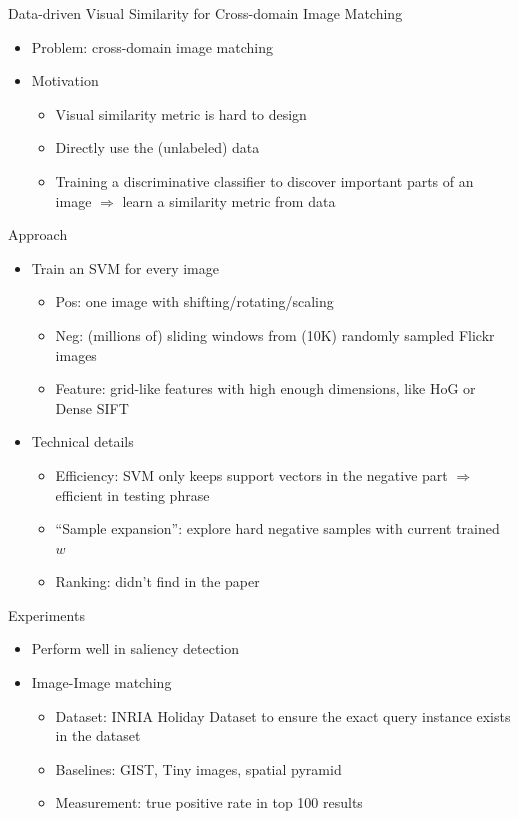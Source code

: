 \documentclass[12pt]{beamer}
\begin{document}
\begin{frame}{Data-driven Visual Similarity for Cross-domain Image Matching}
	\begin{itemize}
		\item Problem: cross-domain image matching
		\item Motivation
		\begin{itemize}
			\item Visual similarity metric is hard to design
			\item Directly use the (unlabeled) data
			\item Training a discriminative classifier to discover important parts of an image $\Rightarrow$ learn a similarity metric from data
		\end{itemize}
	\end{itemize}
\end{frame}

\begin{frame}{Approach}
	\begin{itemize}
		\item Train an SVM for every image
		\begin{itemize}
			\item Pos: one image with shifting/rotating/scaling
			\item Neg: (millions of) sliding windows from (10K) randomly sampled Flickr images
			\item Feature: grid-like features with high enough dimensions, like HoG or Dense SIFT
		\end{itemize}
		\item Technical details
		\begin{itemize}
			\item Efficiency: SVM only keeps support vectors in the negative part $\Rightarrow$ efficient in testing phrase
			\item ``Sample expansion'': explore hard negative samples with current trained $w$
			\item Ranking: didn't find in the paper
		\end{itemize}
	\end{itemize}
\end{frame}

\begin{frame}{Experiments}
	\begin{itemize}
		\item Perform well in saliency detection
		\item Image-Image matching
		\begin{itemize}
			\item Dataset: INRIA Holiday Dataset to ensure the exact query instance exists in the dataset
			\item Baselines: GIST, Tiny images, spatial pyramid
			\item Measurement: true positive rate in top 100 results
		\end{itemize}
	\end{itemize}
\end{frame}
\end{document}

